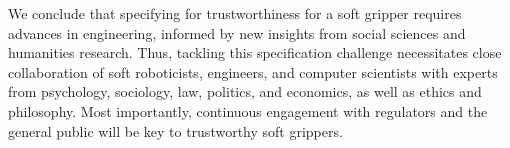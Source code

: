 \documentclass[lettersize,journal]{IEEEtran}
\begin{document}
%
%


We conclude that specifying for trustworthiness for a soft gripper requires advances in engineering, informed by new insights from social sciences and humanities research. Thus, tackling this specification challenge necessitates close collaboration of soft roboticists, engineers, and computer scientists with experts from psychology, sociology, law, politics, and economics, as well as ethics and philosophy. Most importantly, continuous engagement with regulators and the general public will be key to trustworthy soft grippers.
\end{document}
